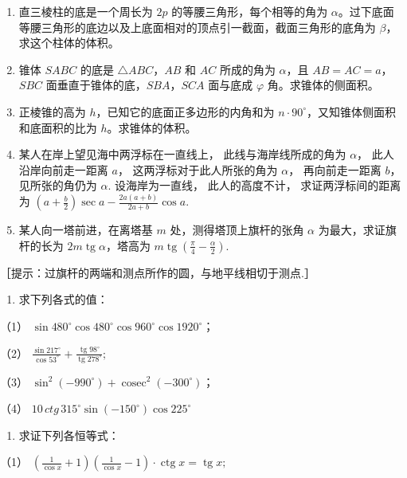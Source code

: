\begin{enumerate}[start=5]
\item
  直三棱柱的底是一个周长为 \(2p\) 的等腰三角形，每个相等的角为
  \(\alpha\)。过下底面等腰三角形的底边以及上底面相对的顶点引一截面，截面三角形的底角为
  \(\beta\)，求这个柱体的体积。
\item
  锥体 \(SABC\) 的底是 \(\triangle ABC\)，\(AB\) 和 \(AC\) 所成的角为
  \(\alpha\)，且 \(AB = AC = a\)，\(SBC\)
  面垂直于锥体的底，\(SBA\)，\(SCA\) 面与底成 \(\varphi\)
  角。求锥体的侧面积。
\item
  正棱锥的高为 \(h\)，已知它的底面正多边形的内角和为
  \(n \cdot 90^{\circ}\)，又知锥体侧面积和底面积的比为
  \(h\)。求锥体的体积。
\item
  某人在岸上望见海中两浮标在一直线上， 此线与海岸线所成的角为
  \(\alpha\)， 此人沿岸向前走一距离 \(a\)， 这两浮标对于此人所张的角为
  \(\alpha\)， 再向前走一距离 \(b\)， 见所张的角仍为 \(\alpha\).
  设海岸为一直线， 此人的高度不计， 求证两浮标间的距离为
  \(\left(a + \frac{b}{2}\right)\sec a - \frac{2a(a + b)}{2a + b}\cos a.\)
\item
  某人向一塔前进，在离塔基 \(m\) 处，测得塔顶上旗杆的张角 \(\alpha\)
  为最大，求证旗杆的长为 \(2m \operatorname{tg} \alpha\)，塔高为
  \(m \operatorname{tg} \left( \frac{\pi}{4} - \frac{\alpha}{2} \right)\).
\end{enumerate}

［提示：过旗杆的两端和测点所作的圆，与地平线相切于测点.］

\begin{enumerate}[start=10]
\item
  求下列各式的值：
\end{enumerate}

（1）
\(\sin 480^{\circ} \cos 480^{\circ} \cos 960^{\circ} \cos 1920^{\circ}\)；

（2）
\(\frac{\sin 217^{\circ}}{\cos 53^{\circ}} + \frac{\operatorname{tg} 98^{\circ}}{\operatorname{tg} 278^{\circ}};\)

（3） \(\sin^2 (-990^\circ) + \operatorname{cosec}^2(-300^\circ)\)；

（4） \(10 \, ctg \, 315^{\circ} \sin(-150^{\circ}) \cos 225^{\circ}\)

\begin{enumerate}[start=11]
\item
  求证下列各恒等式：
\end{enumerate}

（1）
\(\left(\frac{1}{\cos x} + 1\right)\left(\frac{1}{\cos x} - 1\right) \cdot \operatorname{ctg} x =\operatorname{tg}x;\)

